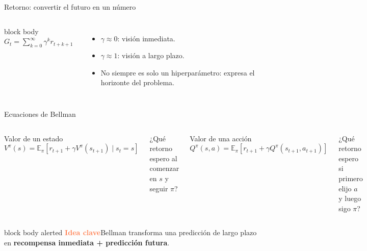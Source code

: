 \documentclass[aspectratio=169,10pt]{beamer}
\newcommand{\keyidea}[1]{%
  \begin{beamercolorbox}[rounded=true,sep=0.65em,wd=\linewidth]{block body alerted}
    \textcolor{Coral}{\bfseries Idea clave}\quad #1
  \end{beamercolorbox}%
}
\begin{document}
\begin{frame}{Retorno: convertir el futuro en un número}
  \begin{columns}[c,onlytextwidth]
      \begin{beamercolorbox}[rounded=true,sep=1em]{block body}
        \centering
        {\Large $G_t=\displaystyle\sum_{k=0}^{\infty}\gamma^k r_{t+k+1}$}
      \end{beamercolorbox}
      \vspace{0.35cm}
      \begin{itemize}
        \item $\gamma\approx 0$: visión inmediata.
        \item $\gamma\approx 1$: visión a largo plazo.
        \item No siempre es solo un hiperparámetro: expresa el horizonte del problema.
      \end{itemize}
      \centering
  \end{columns}
\end{frame}

\begin{frame}{Ecuaciones de Bellman}
  \begin{columns}[T,onlytextwidth]
      \begin{block}{Valor de un estado}
        \[
          V^\pi(s)=\mathbb{E}_\pi\!\left[r_{t+1}+\gamma V^\pi(s_{t+1})\mid s_t=s\right]
        \]
      \end{block}
      \small ¿Qué retorno espero al comenzar en $s$ y seguir $\pi$?
      \begin{alertblock}{Valor de una acción}
        \[
          Q^\pi(s,a)=\mathbb{E}_\pi\!\left[r_{t+1}+\gamma Q^\pi(s_{t+1},a_{t+1})\right]
        \]
      \end{alertblock}
      \small ¿Qué retorno espero si primero elijo $a$ y luego sigo $\pi$?
  \end{columns}

  \vspace{0.55cm}
  \keyidea{Bellman transforma una predicción de largo plazo en \textbf{recompensa inmediata + predicción futura}.}
\end{frame}
\end{document}
